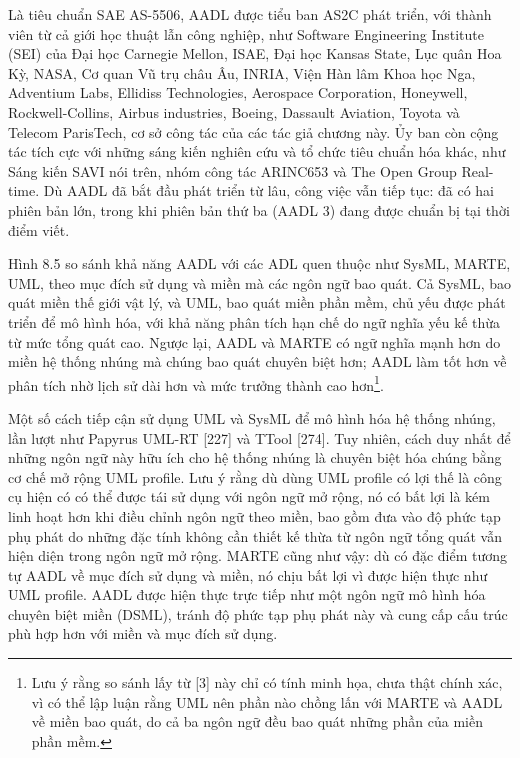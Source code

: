 Là tiêu chuẩn SAE AS-5506, AADL được tiểu ban AS2C phát triển, với thành viên từ cả giới học thuật lẫn công nghiệp, như Software Engineering Institute (SEI) của Đại học Carnegie Mellon, ISAE, Đại học Kansas State, Lục quân Hoa Kỳ, NASA, Cơ quan Vũ trụ châu Âu, INRIA, Viện Hàn lâm Khoa học Nga, Adventium Labs, Ellidiss Technologies, Aerospace Corporation, Honeywell, Rockwell-Collins, Airbus industries, Boeing, Dassault Aviation, Toyota và Telecom ParisTech, cơ sở công tác của các tác giả chương này. Ủy ban còn cộng tác tích cực với những sáng kiến nghiên cứu và tổ chức tiêu chuẩn hóa khác, như Sáng kiến SAVI nói trên, nhóm công tác ARINC653 và The Open Group Real-time. Dù AADL đã bắt đầu phát triển từ lâu, công việc vẫn tiếp tục: đã có hai phiên bản lớn, trong khi phiên bản thứ ba (AADL 3) đang được chuẩn bị tại thời điểm viết.

Hình 8.5 so sánh khả năng AADL với các ADL quen thuộc như SysML, MARTE, UML, theo mục đích sử dụng và miền mà các ngôn ngữ bao quát. Cả SysML, bao quát miền thế giới vật lý, và UML, bao quát miền phần mềm, chủ yếu được phát triển để mô hình hóa, với khả năng phân tích hạn chế do ngữ nghĩa yếu kế thừa từ mức tổng quát cao. Ngược lại, AADL và MARTE có ngữ nghĩa mạnh hơn do miền hệ thống nhúng mà chúng bao quát chuyên biệt hơn; AADL làm tốt hơn về phân tích nhờ lịch sử dài hơn và mức trưởng thành cao hơn\footnote{Lưu ý rằng so sánh lấy từ [3] này chỉ có tính minh họa, chưa thật chính xác, vì có thể lập luận rằng UML nên phần nào chồng lấn với MARTE và AADL về miền bao quát, do cả ba ngôn ngữ đều bao quát những phần của miền phần mềm.}.

Một số cách tiếp cận sử dụng UML và SysML để mô hình hóa hệ thống nhúng, lần lượt như Papyrus UML-RT [227] và TTool [274]. Tuy nhiên, cách duy nhất để những ngôn ngữ này hữu ích cho hệ thống nhúng là chuyên biệt hóa chúng bằng cơ chế mở rộng UML profile. Lưu ý rằng dù dùng UML profile có lợi thế là công cụ hiện có có thể được tái sử dụng với ngôn ngữ mở rộng, nó có bất lợi là kém linh hoạt hơn khi điều chỉnh ngôn ngữ theo miền, bao gồm đưa vào độ phức tạp phụ phát do những đặc tính không cần thiết kế thừa từ ngôn ngữ tổng quát vẫn hiện diện trong ngôn ngữ mở rộng. MARTE cũng như vậy: dù có đặc điểm tương tự AADL về mục đích sử dụng và miền, nó chịu bất lợi vì được hiện thực như UML profile. AADL được hiện thực trực tiếp như một ngôn ngữ mô hình hóa chuyên biệt miền (DSML), tránh độ phức tạp phụ phát này và cung cấp cấu trúc phù hợp hơn với miền và mục đích sử dụng.


